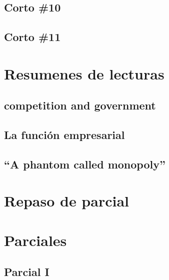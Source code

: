 \documentclass{book}
\begin{document}
\chapter{Corto \#10}

\chapter{Corto \#11}




\part{Resumenes de lecturas}

\chapter{competition and government}


\chapter{La función empresarial}


\chapter{``A phantom called monopoly''}




\part{Repaso de parcial}




\part{Parciales}

\chapter{Parcial I}

\end{document}
